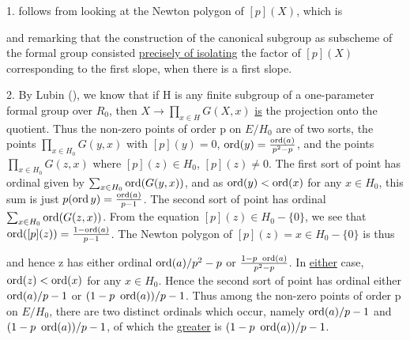 \begin{kaproof}
1. follows from looking at the Newton polygon of $[p](X)$, which is
\begin{center}
\end{center}
and remarking that the construction of the canonical subgroup as subscheme of
the formal group consisted \uline{precisely of isolating} the factor of
$[p](X)$ corresponding to the first slope, when there is a first slope.

2. By Lubin (\cite{lubin67}), we know that if H is any finite subgroup of a one-parameter
formal group over $R_0$, then $X\to\prod_{x\in H} G(X,x)$ \uline{is} the
projection onto the quotient. Thus the non-zero points of order p on $E/H_0$
are of two sorts, the points $\prod_{x\in H_0} G(y,x)$ with $[p](y) = 0$,
$\operatorname{ord}(y) = \frac{\operatorname{ord}(a)}{p^2-p}$, and the points $\prod_{x\in H_0} G(z,x)$
where $[p](z)\in H_0$, $[p](z)\neq 0$. The first sort of point has ordinal
given by $\sum_{x\in H_0} \operatorname{ord}(G(y,x))$, and as $\operatorname{ord}(y)<\operatorname{ord}(x)$ for any
$x\in H_0$, this sum is just $p(\operatorname{ord} y) = \frac{\operatorname{ord}(a)}{p-1}$. The second
sort of point has ordinal $\sum_{x\in H_0} \operatorname{ord}(G(z,x))$. From the equation
$[p](z)\in H_0-\{0\}$, we see that
$\operatorname{ord}([p](z)) = \frac{1-\operatorname{ord}(a)}{p-1}$. The Newton polygon of
$[p](z) = x\in H_0-\{0\}$ is thus
\begin{center}
\end{center}
and hence z has either ordinal $\operatorname{ord}(a)/p^2-p$ or
$\frac{1-p\ \operatorname{ord}(a)}{p^2-p}$. In \uline{either} case, $\operatorname{ord}(z)<\operatorname{ord}(x)$ for any
$x\in H_0$. Hence the second sort of point has ordinal either
$\operatorname{ord}(a)/p-1$ or $(1-p\ \ord(a))/p-1$. Thus among the non-zero points of order
p on $E/H_0$, there are two distinct ordinals which occur, namely
$\operatorname{ord}(a)/p-1$ and $(1-p\ \ord(a))/p-1$, of which the \uline{greater} is
$(1-p\ \ord(a))/p-1$.


\end{kaproof}
